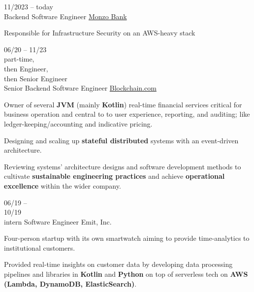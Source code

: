 \begin{entrylist}


    \entry
    {
        11/2023 -- today\\
    }
    {Backend Software Engineer}
    {\href{https://monzo.com}{Monzo Bank}}
    {
        Responsible for Infrastructure Security on an AWS-heavy stack

    }
    \entry
    {
        06/20 -- 11/23\\\footnotesize{part-time,\\ then Engineer,\\ then Senior Engineer}\\
    }
    {Senior Backend Software Engineer}
    {\href{https://blockchain.com/about}{Blockchain.com}}
    {
    Owner of several \textbf{JVM} (mainly \textbf{Kotlin}) real-time financial services critical for business operation and central to
    to user experience, reporting, and auditing; like ledger-keeping/accounting and indicative pricing.

    \para
    Designing and scaling up \textbf{stateful distributed} systems with an event-driven architecture.

    \para
    Reviewing systems' architecture designs and software development methods to cultivate \textbf{sustainable engineering practices}
    and achieve \textbf{operational excellence} within the wider company.



    }
    \entry
    {06/19 -- \\ 10/19\\\footnotesize{intern}}
    {Software Engineer}
    {Emit, Inc.}
    {
        Four-person startup with its own smartwatch aiming to provide time-analytics to
        institutional customers.

        \para
        Provided real-time insights on customer data by developing data processing pipelines and libraries in
    \textbf{Kotlin} and \textbf{Python} on top of serverless tech on \textbf{AWS (Lambda,
        DynamoDB, ElasticSearch)}.
    }
\end{entrylist}
